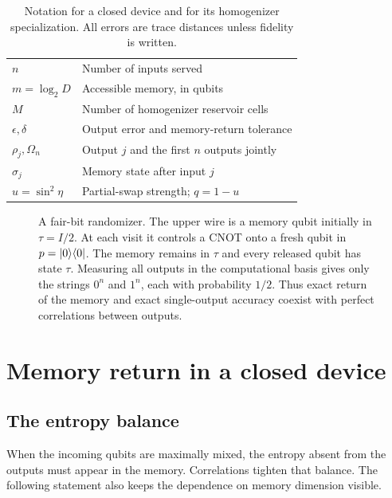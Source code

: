 \documentclass[aps,pra,reprint,superscriptaddress,longbibliography,nofootinbib,floatfix]{revtex4-2}
\begin{document}
\begin{table}[t]
\caption{Notation for a closed device and for its homogenizer specialization. All errors are trace distances unless fidelity is written.}
\label{tab:notation}
\begin{ruledtabular}
\begin{tabular}{lp{}}
$n$ & Number of inputs served\\
$m=\log_2D$ & Accessible memory, in qubits\\
$M$ & Number of homogenizer reservoir cells\\
$\epsilon,\delta$ & Output error and memory-return tolerance\\
$\rho_j,\Omega_n$ & Output $j$ and the first $n$ outputs jointly\\
$\sigma_j$ & Memory state after input $j$\\
$u=\sin^2\eta$ & Partial-swap strength; $q=1-u$\\
\end{tabular}
\end{ruledtabular}
\end{table}

\begin{figure}[!t]
\centering

\caption{A fair-bit randomizer. The upper wire is a memory qubit initially in $\tau=I/2$. At each visit it controls a CNOT onto a fresh qubit in $p=|0\rangle\langle0|$. The memory remains in $\tau$ and every released qubit has state $\tau$. Measuring all outputs in the computational basis gives only the strings $0^n$ and $1^n$, each with probability $1/2$. Thus exact return of the memory and exact single-output accuracy coexist with perfect correlations between outputs.}
\label{fig:fairbit}
\end{figure}

\section{Memory return in a closed device}\label{sec:general}

\subsection{The entropy balance}

When the incoming qubits are maximally mixed, the entropy absent from the outputs must appear in the memory. Correlations tighten that balance. The following statement also keeps the dependence on memory dimension visible.
\end{document}
